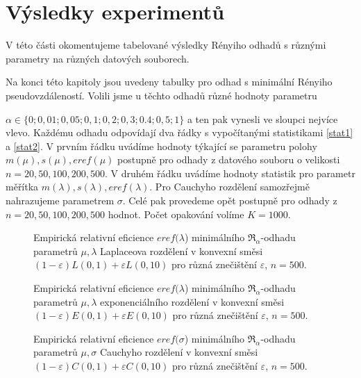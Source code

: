 \section{Výsledky experimentů}


V této části okomentujeme tabelované výsledky Rényiho odhadů s různými parametry na různých datových souborech.

Na konci této kapitoly jsou uvedeny tabulky pro odhad s minimální Rényiho pseudovzdá\-le\-nos\-tí. Volili jsme u těchto odhadů různé hodnoty parametru 

\noindent $\alpha \in \lbrace 0;0,01;0,05;0,1;0,2;0,3;0.4;0,5;1 \rbrace$ a ten pak vynesli ve sloupci nejvíce vlevo. Každému odhadu odpovídají dva řádky s vypočítanými statistikami \eqref{stat1} a \eqref{stat2}. V prvním řádku uvádíme hodnoty týkající se parametru polohy $m(\mu), s(\mu), eref(\mu)$ postupně pro odhady z datového souboru o velikosti $n = 20, 50 ,100, 200, 500$. V druhém řádku uvádíme hodnoty statistik pro parametr měřítka $m(\lambda), s(\lambda), eref(\lambda)$. Pro Cauchyho rozdělení samozřejmě nahrazujeme parametrem $\sigma$. Celé pak provedeme opět postupně pro odhady z $n = 20, 50 ,100, 200, 500$ hodnot. Počet opakování volíme $K = 1000$.

\begin{figure}[htb]
	\begin{center}
		\caption{Empirická relativní eficience $eref({\lambda}$) minimálního $\mathfrak{R}_\alpha$-odhadu parametrů  $\mu,\lambda$ Laplaceova rozdělení v konvexní směsi	$(1-\varepsilon)L(0,1) + \varepsilon L(0,10)$ pro různá znečištění $\varepsilon$, $n=500$.}
		\label{fig-eref-Laplace-lambda}
	\end{center}
\end{figure}

\begin{figure}[htb]
	\begin{center}
		\caption{Empirická relativní eficience $eref({\lambda}$) minimálního $\mathfrak{R}_\alpha$-odhadu parametrů $\mu,\lambda$ exponenciálního rozdělení v konvexní směsi 
		$(1-\varepsilon)E(0,1) + \varepsilon E(0,10)$ pro různá znečištění $\varepsilon$, $n=500$.}
		\label{fig-eref-Exp-lambda}
	\end{center}
\end{figure}

\begin{figure}[htb]
	\begin{center}
		\caption{Empirická relativní eficience $eref({\sigma}$) minimálního $\mathfrak{R}_\alpha$-odhadu parametrů  $\mu,\sigma$ Cauchyho rozdělení v konvexní směsi	$(1-\varepsilon)C(0,1) + \varepsilon C(0,10)$ pro různá znečištění $\varepsilon$, $n=500$.}
		\label{fig-eref-Cauchy-sigma}
	\end{center}
\end{figure}

